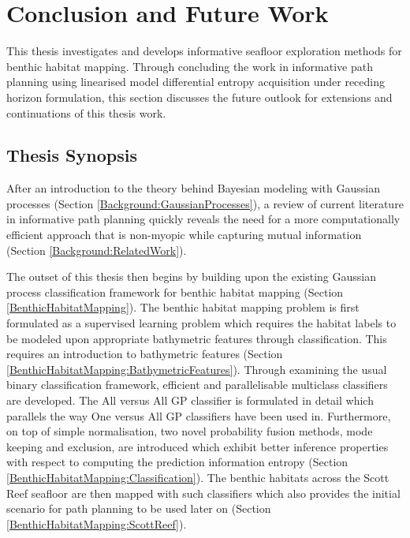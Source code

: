 \chapter{Conclusion and Future Work}
\label{Conclusion}

	This thesis investigates and develops informative seafloor exploration methods for benthic habitat mapping. Through concluding the work in informative path planning using linearised model differential entropy acquisition under receding horizon formulation, this section discusses the future outlook for extensions and continuations of this thesis work.
	
	\section{Thesis Synopsis}
	
		After an introduction to the theory behind Bayesian modeling with Gaussian processes (Section \ref{Background:GaussianProcesses}), a review of current literature in informative path planning quickly reveals the need for a more computationally efficient approach that is non-myopic while capturing mutual information (Section \ref{Background:RelatedWork}).
		
		The outset of this thesis then begins by building upon the existing Gaussian process classification framework for benthic habitat mapping (Section \ref{BenthicHabitatMapping}). The benthic habitat mapping problem is first formulated as a supervised learning problem which requires the habitat labels to be modeled upon appropriate bathymetric features through classification. This requires an introduction to bathymetric features (Section \ref{BenthicHabitatMapping:BathymetricFeatures}). Through examining the usual binary classification framework, efficient and parallelisable multiclass classifiers are developed. The All versus All GP classifier is formulated in detail which parallels the way One versus All GP classifiers have been used in. Furthermore, on top of simple normalisation, two novel probability fusion methods, mode keeping and exclusion, are introduced which exhibit better inference properties with respect to computing the prediction information entropy (Section \ref{BenthicHabitatMapping:Classification}). The benthic habitats across the Scott Reef seafloor are then mapped with such classifiers which also provides the initial scenario for path planning to be used later on (Section \ref{BenthicHabitatMapping:ScottReef}).
		
